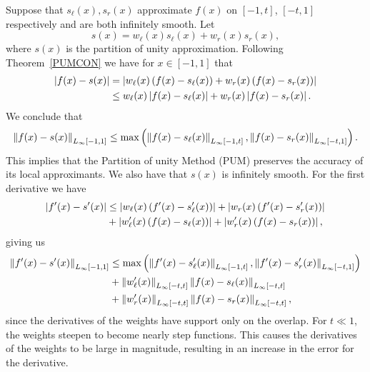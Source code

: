 Suppose that $s_{\ell}(x),s_{r}(x)$ approximate $f(x)$ on $[-1,t]$, $[-t,1]$ respectively and are both infinitely smooth. Let
\begin{equation}
s(x) = w_{\ell}(x)s_{\ell}(x)+w_{r}(x)s_{r}(x),
\label{PUM2}
\end{equation}
where $s(x)$ is the partition of unity approximation. Following Theorem~\ref{PUMCON} we have for $x \in [-1,1]$ that
\begin{equation}
\begin{aligned}
\left | f(x)-s(x) \right | &= \left | w_{\ell}(x) \left( f(x) - s_{\ell}(x) \right) + w_{r}(x) \left( f(x) - s_{r}(x) \right) \right | \\
&\leq w_{\ell}(x) \left | f(x) - s_{\ell}(x) \right | + w_{r}(x) \left | f(x) - s_{r}(x) \right |.
\end{aligned}
\end{equation}
We conclude that
\begin{align}
\left \| f(x)-s(x) \right \|_{L_{\infty}[-1,1]} \leq \max \left( \left \| f(x)-s_{\ell}(x) \right \|_{L_{\infty}[-1,t]} , \left \| f(x)-s_{r}(x) \right \|_{L_{\infty}[-t,1]} \right).
\label{POU_UP}
\end{align}
This implies that the Partition of unity Method (PUM) preserves the accuracy of its local approximants. We also have that $s(x)$ is infinitely smooth. For the first derivative we have
\begin{equation}
\begin{aligned}
\left | f'(x)-s'(x) \right | &\leq \left | w_{\ell}(x) \left( f'(x)-s_{\ell}'(x) \right) \right |+\left | w_{r}(x) \left( f'(x)-s_{r}'(x) \right) \right | \\
&+\left | w_{\ell
}'(x) \left( f(x)-s_{\ell}(x) \right) \right | +\left | w_{r}'(x) \left( f(x)-s_{r}(x) \right) \right |,
\end{aligned}
\end{equation}
giving us
\begin{equation}
\begin{aligned}
\left \| f'(x)-s'(x) \right \|_{L_{\infty}[-1,1]} &\leq \max \left( \left \| f'(x)-s_{\ell}'(x) \right \|_{L_{\infty}[-1,t]} , \left \| f'(x)-s_{r}'(x) \right \|_{L_{\infty}[-t,1]} \right) \\
&+\left \| w_{\ell}'(x) \right \|_{L_{\infty}[-t,t]} \left \| f(x)-s_{\ell}(x)\right \|_{L_{\infty}[-t,t]}\\ 
&+ \left \| w_{r}'(x) \right \|_{L_{\infty}[-t,t]} \left \| f(x)-s_{r}(x)\right \|_{L_{\infty}[-t,t]},
\end{aligned}
\label{diff_error}
\end{equation}
since the derivatives of the weights have support only on the overlap. For $t \ll 1$, the weights steepen to become nearly step functions. This causes the derivatives of the weights to be large in magnitude, resulting in an increase in the error for the derivative.

